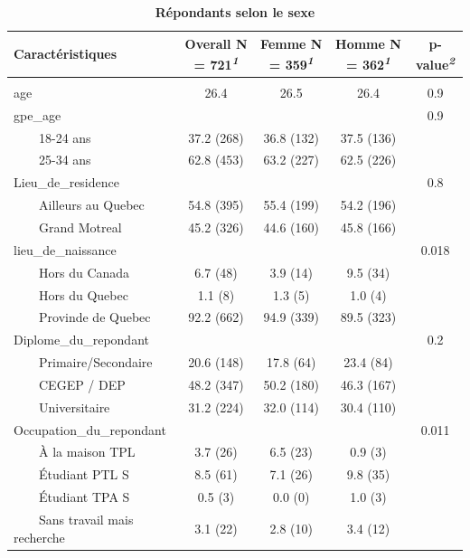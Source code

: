 \documentclass[
]{article}
\begin{document}
\newpage
\begin{table}[!t]
\caption{\label{tab:unnamed-chunk-20}\textbf{Répondants selon le sexe}} 
\fontsize{12.0pt}{14.4pt}\selectfont
\begin{tabular*}{\linewidth}{@{\extracolsep{\fill}}lcccc}
\toprule
\textbf{Caractéristiques} & \textbf{Overall}  N = 721\textsuperscript{\textit{1}} & \textbf{Femme}  N = 359\textsuperscript{\textit{1}} & \textbf{Homme}  N = 362\textsuperscript{\textit{1}} & \textbf{p-value}\textsuperscript{\textit{2}} \\ 
\midrule\addlinespace[2.5pt]
\multicolumn{5}{l}{Répondants} \\[2.5pt] 
\midrule\addlinespace[2.5pt]
age & 26.4 & 26.5 & 26.4 & 0.9 \\ 
gpe\_age &  &  &  & 0.9 \\ 
    18-24 ans & 37.2   (268) & 36.8   (132) & 37.5   (136) &  \\ 
    25-34 ans & 62.8   (453) & 63.2   (227) & 62.5   (226) &  \\ 
Lieu\_de\_residence &  &  &  & 0.8 \\ 
    Ailleurs au Quebec & 54.8   (395) & 55.4   (199) & 54.2   (196) &  \\ 
    Grand Motreal & 45.2   (326) & 44.6   (160) & 45.8   (166) &  \\ 
lieu\_de\_naissance &  &  &  & 0.018 \\ 
    Hors du Canada & 6.7   (48) & 3.9   (14) & 9.5   (34) &  \\ 
    Hors du Quebec & 1.1   (8) & 1.3   (5) & 1.0   (4) &  \\ 
    Provinde de Quebec & 92.2   (662) & 94.9   (339) & 89.5   (323) &  \\ 
Diplome\_du\_repondant &  &  &  & 0.2 \\ 
    Primaire/Secondaire & 20.6   (148) & 17.8   (64) & 23.4   (84) &  \\ 
    CEGEP / DEP & 48.2   (347) & 50.2   (180) & 46.3   (167) &  \\ 
    Universitaire & 31.2   (224) & 32.0   (114) & 30.4   (110) &  \\ 
Occupation\_du\_repondant &  &  &  & 0.011 \\ 
    À la maison TPL & 3.7   (26) & 6.5   (23) & 0.9   (3) &  \\ 
    Étudiant PTL S & 8.5   (61) & 7.1   (26) & 9.8   (35) &  \\ 
    Étudiant TPA S & 0.5   (3) & 0.0   (0) & 1.0   (3) &  \\ 
    Sans travail mais recherche & 3.1   (22) & 2.8   (10) & 3.4   (12) &  \\ 

\end{tabular*}
\end{table}
\end{document}
